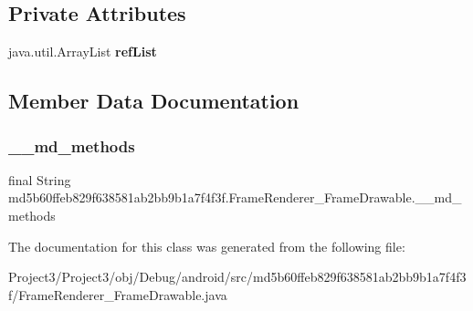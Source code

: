 \subsection*{Private Attributes}
\begin{DoxyCompactItemize}
\item 
\mbox{\label{classmd5b60ffeb829f638581ab2bb9b1a7f4f3f_1_1FrameRenderer__FrameDrawable_a9768e82d526f8d55fc2d2d5cc7f6bf10}} 
java.\+util.\+Array\+List {\bfseries ref\+List}
\end{DoxyCompactItemize}


\subsection{Member Data Documentation}
\mbox{\label{classmd5b60ffeb829f638581ab2bb9b1a7f4f3f_1_1FrameRenderer__FrameDrawable_acfbbaabd3b64c552efa12d5d5b5d7e8b}} 
\subsubsection{\texorpdfstring{\+\_\+\+\_\+md\+\_\+methods}{\_\_md\_methods}}
{\footnotesize\ttfamily final String md5b60ffeb829f638581ab2bb9b1a7f4f3f.\+Frame\+Renderer\+\_\+\+Frame\+Drawable.\+\_\+\+\_\+md\+\_\+methods\hspace{0.3cm}{\ttfamily [static]}}



The documentation for this class was generated from the following file\+:\begin{DoxyCompactItemize}
\item 
Project3/\+Project3/obj/\+Debug/android/src/md5b60ffeb829f638581ab2bb9b1a7f4f3f/Frame\+Renderer\+\_\+\+Frame\+Drawable.\+java\end{DoxyCompactItemize}

